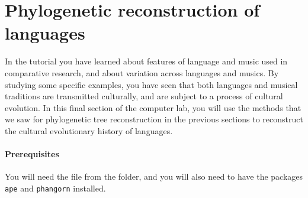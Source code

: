 \documentclass[a4paper, 9pt]{article}
\begin{document}
\section{Phylogenetic reconstruction of languages}
In the tutorial you have learned about features of language and music used in comparative research, and about variation across languages and musics. By studying some specific examples, you have seen that both languages and musical traditions are transmitted culturally, and are subject to a process of cultural evolution. In this final section of the computer lab, you will use the methods that we saw for phylogenetic tree reconstruction in the previous sections to reconstruct the cultural evolutionary history of languages.

\paragraph{Prerequisites} You will need the file  from the  folder, and you will also need to have the packages \texttt{ape} and \texttt{phangorn} installed.
\end{document}
